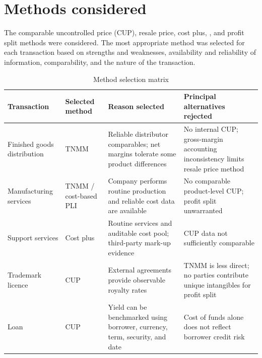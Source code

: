\section{Methods considered}
The comparable uncontrolled price (CUP), resale price, cost plus, \TNMM, and
profit split methods were considered. The most appropriate method was selected
for each transaction based on strengths and weaknesses, availability and
reliability of information, comparability, and the nature of the transaction.

\begin{table}[htbp]
  \centering
  \caption{Method selection matrix}
  \small
  \begin{tabularx}{\textwidth}{@{}P{31mm}P{25mm}Y Y@{}}
    \toprule
    \textbf{Transaction} & \textbf{Selected method} &
      \textbf{Reason selected} & \textbf{Principal alternatives rejected}\\
    \midrule
    Finished goods distribution & TNMM & Reliable distributor comparables; net margins tolerate some product differences & No internal CUP; gross-margin accounting inconsistency limits resale price method\\
    Manufacturing services & TNMM / cost-based PLI & Company performs routine production and reliable cost data are available & No comparable product-level CUP; profit split unwarranted\\
    Support services & Cost plus & Routine services and auditable cost pool; third-party mark-up evidence & CUP data not sufficiently comparable\\
    Trademark licence & CUP & External agreements provide observable royalty rates & TNMM is less direct; no parties contribute unique intangibles for profit split\\
    Loan & CUP & Yield can be benchmarked using borrower, currency, term, security, and date & Cost of funds alone does not reflect borrower credit risk\\
    \bottomrule
  \end{tabularx}
\end{table}
